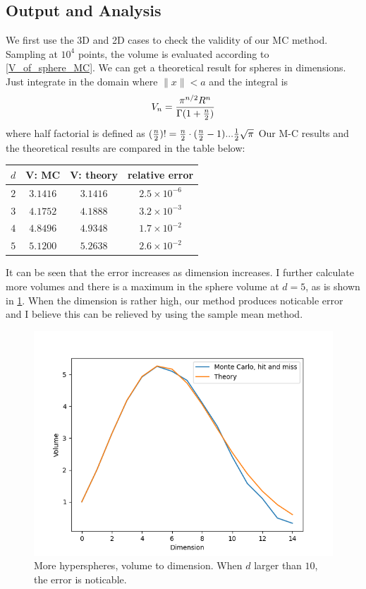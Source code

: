 \documentclass{article}
\begin{document}
\subsection{Output and Analysis}
We first use the 3D and 2D cases to check the validity of our MC method. Sampling at $10^4$ points, the volume is evaluated according to \ref{V_of_sphere_MC}.
We can get a theoretical result for spheres in dimensions. Just integrate in the domain where $\|x\| <a $ and the integral is
\begin{align}
	V_n = {\pi^{n/2}R^n\over \Gamma (1+{n\over 2})}
\end{align}
where half factorial is defined as $({n\over 2})! = {n\over 2}\cdot({n\over 2} - 1)...{1\over 2}\sqrt{\pi}$
Our M-C results and the theoretical results are compared in the table below:
\begin{center}
	\begin{tabular}{ c | c | c | c }
	\hline
		$d$ & V: MC & V: theory & relative error \\
		\hline
		$2$ & $3.1416$ & $3.1416$ & $2.5\times 10^{-6}$\\
		\hline
		$3$ & $4.1752$ & $4.1888$ & $3.2\times 10^{-3}$\\
		\hline
		$4$ & $4.8496$ & $4.9348$ & $1.7\times 10^{-2}$ \\ 
		\hline
		$5$ & $5.1200$ & $5.2638$ & $2.6\times 10^{-2}$ \\
		\hline
	\end{tabular}
\end{center}
It can be seen that the error increases as dimension increases. I further calculate more volumes and there is a maximum in the sphere volume at $d=5$, as is shown in \ref{fig:q1}. When the dimension is rather high, our method produces noticable error and I believe this can be relieved by using the sample mean method.

\begin{figure}[!htb]
    \centering
    \includegraphics[width=1\textwidth]{q1.png}
    \caption{More hyperspheres, volume to dimension. When $d$ larger than $10$, the error is noticable.}
    \label{fig:q1}
\end{figure}
\end{document}
